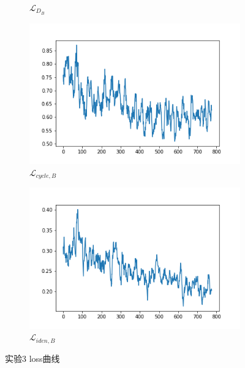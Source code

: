 \documentclass{beamer}
\begin{document}
\begin{frame}
\begin{figure}[htb]
\begin{subfigure}[b]{0.23\linewidth}
        \caption{$\mathcal{L}_{D_B}$}
      \end{subfigure}
      \begin{subfigure}[b]{0.23\linewidth}
        \includegraphics[width=\linewidth]{exp3_cycle_B.png}
        \caption{$\mathcal{L}_{cycle,B}$}
      \end{subfigure}
      \begin{subfigure}[b]{0.23\linewidth}
        \includegraphics[width=\linewidth]{exp3_idt_B.png}
        \caption{$\mathcal{L}_{iden,B}$}
      \end{subfigure}
      \caption{实验3 loss曲线}
      \label{fig:exp3loss}
\end{figure}
\end{frame}
\end{document}
